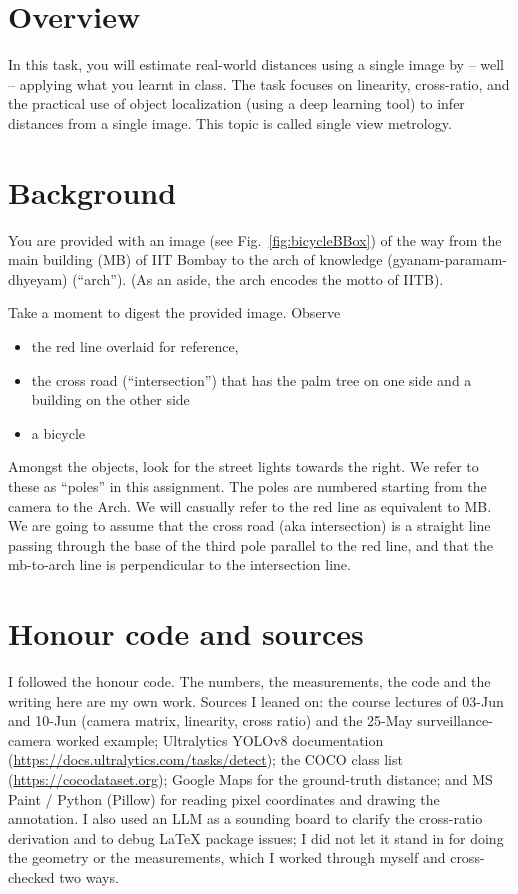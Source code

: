 
\section{Overview}

In this task, you will estimate real-world distances using a single
image by -- well -- applying what you learnt in class. The task
focuses on  linearity, cross-ratio, and the practical use
of object localization (using a  deep learning tool) to infer
distances from a single image. This topic is called single view metrology.

\section{Background}

You are provided with an image (see Fig.~\ref{fig:bicycleBBox}) of
the way from the main building
(MB) of IIT Bombay to the arch of knowledge (gyanam-paramam-dhyeyam) (``arch''). (As an aside, the arch encodes the motto of IITB).

Take a moment to digest the provided image. Observe
\begin{itemize} 
\item the red line overlaid for reference, 
\item the cross road (``intersection'') that has the palm tree on one side and a building
on the other side
\item a bicycle
\end{itemize}

Amongst the  objects, look for the street lights  towards the right. We refer to these as 
``poles'' in this assignment. The poles are numbered starting from the camera to the Arch. We will casually refer to the red line as equivalent to MB.
We are
going to assume that the cross road (aka intersection)  is a straight line passing
through the base of the third pole parallel to the red
line, and that the mb-to-arch line is perpendicular to
the intersection line.


\section*{Honour code and sources}
I followed the honour code. The numbers, the measurements, the code and
the writing here are my own work. Sources I leaned on: the course
lectures of 03-Jun and 10-Jun (camera matrix, linearity, cross ratio)
and the 25-May surveillance-camera worked example; Ultralytics YOLOv8
documentation (\url{https://docs.ultralytics.com/tasks/detect}); the
COCO class list (\url{https://cocodataset.org}); Google Maps for the
ground-truth distance; and MS Paint / Python (Pillow) for reading pixel
coordinates and drawing the annotation. I also used an LLM as a sounding
board to clarify the cross-ratio derivation and to debug LaTeX package
issues; I did not let it stand in for doing the geometry or the
measurements, which I worked through myself and cross-checked two ways.

